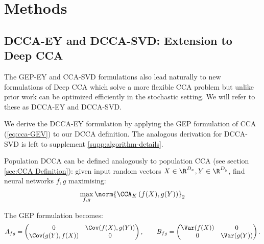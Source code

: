 \section{Methods}

\subsection{DCCA-EY and DCCA-SVD: Extension to Deep CCA}\label{sec:deep-cca}
The GEP-EY and CCA-SVD formulations also lead naturally to new formulations of Deep CCA which solve a more flexible CCA problem but unlike prior work can be optimized efficiently in the stochastic setting. We will refer to these as DCCA-EY and DCCA-SVD.

We derive the DCCA-EY formulation by applying the GEP formulation of CCA (\ref{eq:cca-GEV}) to our DCCA definition. The analogous derivation for DCCA-SVD is left to supplement \ref{supp:algorithm-details}. 

Population DCCA \cite{andrew2013deep} can be defined analogously to population CCA (see section \ref{sec:CCA Definition}):
given input random vectors $X \in \R^{D_x}, Y \in \R^{D_y}$, find neural networks $f,g$ maximising:
\begin{align}\label{eq:DCCA-Andrew}
    \max_{f,g}  \norm{\CCA_K\left(f(X),g(Y)\right)}_2
\end{align}

The GEP formulation becomes:
\begin{equation*}
    A_{fg} = \begin{pmatrix} 0 &\Cov(f(X),g(Y)) \\ \Cov(g(Y),f(X)) & 0 \end{pmatrix}, \qquad
	B_{fg} = \begin{pmatrix}\Var(f(X)) & 0 \\ 0 & \Var(g(Y)) \end{pmatrix}.
\end{equation*}


